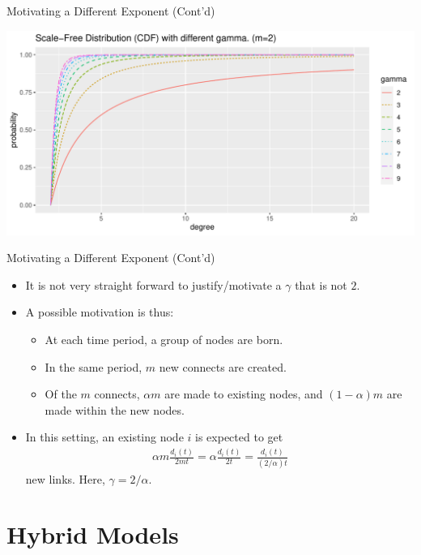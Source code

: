 \documentclass{beamer}
\begin{document}
\begin{frame}{Motivating a Different Exponent (Cont'd)}
	\begin{center}
		\includegraphics[width=\textwidth]{figures-R/scalefree_distribution-cdf.pdf}
	\end{center}
\end{frame}

\begin{frame}{Motivating a Different Exponent (Cont'd)}
	\begin{itemize}
		\item
			It is not very straight forward to justify/motivate a $\gamma$ that is not $2$.
		\item
			A possible motivation is thus:
			\begin{itemize}
				\item
					At each time period, a group of nodes are born.
				\item
					In the same period, $m$ new connects are created.
				\item
					Of the $m$ connects,
					$\alpha m$ are made to existing nodes, and
					$(1-\alpha) m$ are made within the new nodes.
			\end{itemize}
		\item
			In this setting,
			an existing node $i$ is expected to get
			\begin{align*}
				\alpha m \frac{d_{i}(t)}{2mt}
				= \alpha \frac{d_{i}(t)}{2t}
				= \frac{d_{i}(t)}{(2/\alpha)t}
			\end{align*}
			new links.
			Here, $\gamma=2/\alpha$.
	\end{itemize}
\end{frame}

\section{Hybrid Models}
\end{document}
